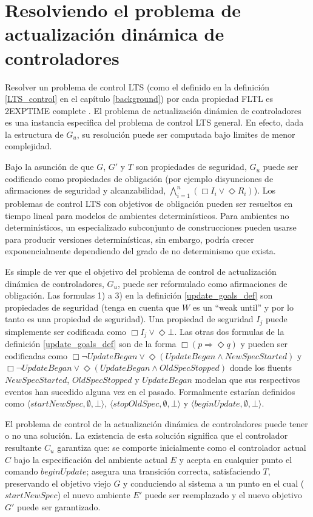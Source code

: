 \section{Resolviendo el problema de actualización dinámica de controladores}

Resolver un problema de control LTS (como el definido en la definición \ref{LTS_control} en el capítulo
\ref{background}) por cada propiedad FLTL es 2EXPTIME complete \cite{Pnueli:1989:SRM:75277.75293}. El problema de
actualización dinámica de controladores es una instancia especifica del problema de control LTS general. En efecto, dada
la estructura de $G_u$, su resolución puede ser computada bajo limites de menor complejidad.

Bajo la asunción de que $G$, $G'$ y $T$ son propiedades de seguridad, $G_u$ puede ser codificado como propiedades de
obligación (por ejemplo disyunciones de afirmaciones de seguridad y alcanzabilidad, $\bigwedge^n_{i=1}(\Box I_i \lor
\Diamond R_i)$). Los problemas de control LTS con objetivos de obligación pueden ser resueltos en tiempo lineal para
modelos de ambientes determinísticos. Para ambientes no determinísticos, un especializado subconjunto de construcciones
pueden usarse para producir versiones determinísticas, sin embargo, podría crecer exponencialmente dependiendo del grado
de no determinismo que exista.

Es simple de ver que el objetivo del problema de control de actualización dinámica de controladores, $G_u$, puede ser
reformulado como afirmaciones de obligación. Las formulas 1) a 3) en la definición \ref{update_goals_def} son propiedades
de seguridad (tenga en cuenta que $W$ es un ``weak until'' y por lo tanto es una propiedad de seguridad). Una propiedad
de seguridad $I_j$ puede simplemente ser codificada como $\Box I_j \lor \Diamond \bot$. Las otras dos formulas de la
definición \ref{update_goals_def} son de la forma $\Box(p \Longrightarrow \Diamond q)$ y pueden ser codificadas como
$\Box \neg UpdateBegan \lor \Diamond (UpdateBegan \wedge NewSpecStarted)$ y $\Box \neg UpdateBegan \lor \Diamond
(UpdateBegan \wedge OldSpecStopped)$ donde los fluents $NewSpecStarted$, $OldSpecStopped$ y $UpdateBegan$ modelan que sus
respectivos eventos han sucedido alguna vez en el pasado. Formalmente estarían definidos como $\langle{startNewSpec},
\emptyset, \bot \rangle$, $\langle{stopOldSpec}, \emptyset, \bot \rangle$ y $\langle{beginUpdate}, \emptyset, \bot
\rangle$.

El problema de control de la actualización dinámica de controladores puede tener o no una solución. La existencia de 
esta solución significa que el controlador resultante $C_u$ garantiza que: se comporte inicialmente como el controlador
actual $C$ bajo la especificación del ambiente actual $E$ y acepta en cualquier punto el comando $beginUpdate$; asegura
una transición correcta, satisfaciendo $T$, preservando el objetivo viejo $G$ y conduciendo al sistema a un punto en el
cual ($startNewSpec$) el nuevo ambiente $E'$ puede ser reemplazado y el nuevo objetivo $G'$ puede ser garantizado.

